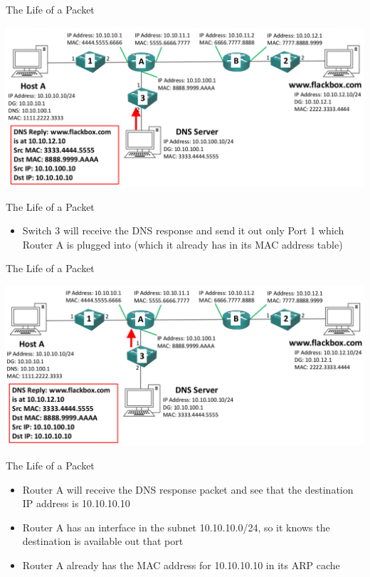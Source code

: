 \documentclass[pdflatex,compress,mathserif]{beamer}
\begin{document}
\begin{frame}{The Life of a Packet}
	\begin{center}
		\includegraphics[width=\linewidth]{img/img36}
	\end{center}
\end{frame}

\begin{frame}{The Life of a Packet}
	\begin{itemize}
		\item Switch 3 will receive the DNS response and send it out only Port 1 which Router A is plugged into (which it already has in its MAC address
		table)
	\end{itemize}
\end{frame}

\begin{frame}{The Life of a Packet}
	\begin{center}
		\includegraphics[width=\linewidth]{img/img37}
	\end{center}
\end{frame}

\begin{frame}{The Life of a Packet}
	\begin{itemize}
		\item Router A will receive the DNS response packet and see that the destination IP address is 10.10.10.10
		\item Router A has an interface in the subnet 10.10.10.0/24, so it knows the destination is available out that port
		\item Router A already has the MAC address for 10.10.10.10 in its ARP cache
	\end{itemize}
\end{frame}
\end{document}
